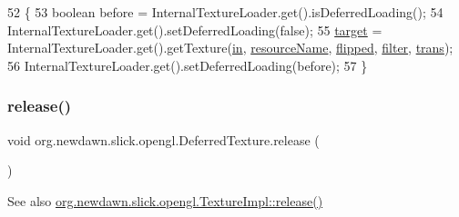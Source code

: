 \begin{DoxyCode}
52                                           \{
53         \textcolor{keywordtype}{boolean} before = InternalTextureLoader.get().isDeferredLoading();
54         InternalTextureLoader.get().setDeferredLoading(\textcolor{keyword}{false});
55         \mbox{\hyperlink{classorg_1_1newdawn_1_1slick_1_1opengl_1_1_deferred_texture_aa70a4b195d0b965a0099d0e7bc18d9d2}{target}} = InternalTextureLoader.get().getTexture(\mbox{\hyperlink{classorg_1_1newdawn_1_1slick_1_1opengl_1_1_deferred_texture_a489ed93637c4777d8f36d17233a77d59}{in}}, \mbox{\hyperlink{classorg_1_1newdawn_1_1slick_1_1opengl_1_1_deferred_texture_a883fc20f133626f8f49684adb5b65976}{resourceName}}, 
      \mbox{\hyperlink{classorg_1_1newdawn_1_1slick_1_1opengl_1_1_deferred_texture_a1dcb7e5cee99769047c984f3fe8f7a8f}{flipped}}, \mbox{\hyperlink{classorg_1_1newdawn_1_1slick_1_1opengl_1_1_deferred_texture_abb572d47ae7bce7204cc9c86245c9797}{filter}}, \mbox{\hyperlink{classorg_1_1newdawn_1_1slick_1_1opengl_1_1_deferred_texture_a8dc1083c72d7039e412c71e1cd75d4e6}{trans}});
56         InternalTextureLoader.get().setDeferredLoading(before);
57     \}
\end{DoxyCode}
\mbox{\label{classorg_1_1newdawn_1_1slick_1_1opengl_1_1_deferred_texture_a325dc5462234780a1c290225350354e5}} 
\subsubsection{\texorpdfstring{release()}{release()}}
{\footnotesize\ttfamily void org.\+newdawn.\+slick.\+opengl.\+Deferred\+Texture.\+release (\begin{DoxyParamCaption}{ }\end{DoxyParamCaption})\hspace{0.3cm}{\ttfamily [inline]}}

\begin{DoxySeeAlso}{See also}
\mbox{\hyperlink{classorg_1_1newdawn_1_1slick_1_1opengl_1_1_texture_impl_ad039511f5655274072eac9595411d969}{org.\+newdawn.\+slick.\+opengl.\+Texture\+Impl\+::release()}} 
\end{DoxySeeAlso}


